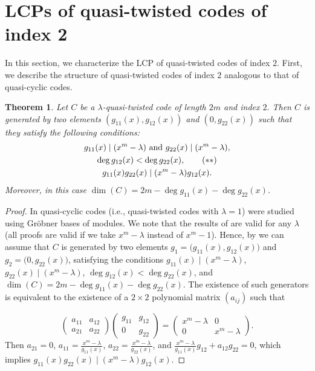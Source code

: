 \documentclass[12 pt]{extarticle}
\numberwithin{equation}{section}
\newtheorem{theorem}{Theorem}[section]
\theoremstyle{definition}
\begin{document}
\section{LCPs of quasi-twisted codes of index 2}\label{secqtlcp}
In this section, we characterize the LCP of quasi-twisted codes of index $2$. First, we describe the structure of quasi-twisted codes of index $2$ analogous to that of quasi-cyclic codes. 
\begin{theorem} \label{qt2}
Let $C$ be a $\lambda$-quasi-twisted code of length $2m$ and index $2.$ 
Then $C$ is generated by two elements $(g_{11}(x), g_{12}(x))$ and $(0, g_{22}(x))$ such that they satisfy the following conditions: 
\begin{gather}  
g_{11}(x) \mid (x^m-\lambda) \text{ and } g_{22}(x) \mid(x^m-\lambda), \notag \\
\deg g_{12}(x) < \deg g_{22}(x), \tag{$\ast\ast$}\\
g_{11}(x)g_{22}(x) \mid (x^m-\lambda)g_{12}(x). \notag
\end{gather}
 Moreover, in this case $\dim (C) = 2m-\deg g_{11}(x)-\deg g_{22}(x)$.
\end{theorem}
\begin{proof}
In \cite{lally2001} quasi-cyclic codes (i.e., quasi-twisted codes with $\lambda=1$) were studied using Gr\"{o}bner bases of modules. 
We note that the results of \cite{lally2001}  are valid for any $\lambda$ (all proofs are valid if we take $x^m-\lambda$ instead of 
$x^m-1$). 
Hence, by  \cite{lally2001}   we can assume that $C$ is generated by two elements $g_1=\big( g_{11}(x),g_{12}(x)\big)$ and 
$g_2=\big( 0,g_{22}(x)\big)$, satisfying the conditions 
$g_{11}(x)\mid (x^m-\lambda)$, $g_{22}(x)\mid (x^m-\lambda)$, $\deg g_{12} (x) < \deg g_{22}(x)$, 
and $\dim (C) = 2m- \deg g_{11}(x) - \deg g_{22}(x)$. 
The existence of such generators is equivalent \cite{lally2001} to the existence of a $2\times 2$ polynomial matrix 
$(a_{ij})$ such that 

$$
\left(
\begin{array}{cc}
 a_{11} &  a_{12}  \\
 a_{21} &  a_{22} 
\end{array}
\right)
\left(
\begin{array}{cc}
 g_{11} &  g_{12}  \\
 0 &  g_{22} 
\end{array}
\right) = 
\left(
\begin{array}{cc}
 x^m-\lambda&  0  \\
 0 &  x^m-\lambda
\end{array}
\right).
$$
Then $a_{21}=0$,  $a_{11}=\frac{x^m-\lambda}{g_{11}(x)}$,  $a_{22}=\frac{x^m-\lambda}{g_{22}(x)}$,  and 
$\frac{x^m-\lambda}{g_{11}(x)} g_{12} + a_{12} g_{22} =0$, which implies  $g_{11}(x)g_{22}(x) \mid  (x^m-\lambda) g_{12}(x)$.     
\end{proof}
\end{document}
